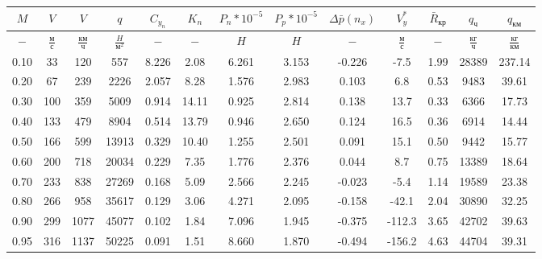 \begin{tabular}{|c|c|c|c|c|c|c|c|c|c|c|c|c|}
\hline
$M$ & $V$ & $V$ & $q$ & $C_{y_n}$ & $K_n$ & $P_n*10^{-5}$ & $P_p*10^{-5}$ & $\Delta \bar{p}(n_x)$ & $V_y^*$ & $\bar{R}_{кр}$ & $q_{ч}$ & $q_{км}$ \\ 
\hline
$-$ & $\frac{м}{с}$ & $\frac{км}{ч}$ & $\frac{H}{м^2}$ & $-$ & $-$ & $H$ & $H$ & $-$ & $\frac{м}{с}$ & $-$ & $\frac{кг}{ч}$ & $\frac{кг}{км}$ \\ 
\hline
0.10 & 33 & 120 & 557 & 8.226 & 2.08 & 6.261 & 3.153 & -0.226 & -7.5 & 1.99 & 28389 & 237.14 \\ 
\hline
0.20 & 67 & 239 & 2226 & 2.057 & 8.28 & 1.576 & 2.983 & 0.103 & 6.8 & 0.53 & 9483 & 39.61 \\ 
\hline
0.30 & 100 & 359 & 5009 & 0.914 & 14.11 & 0.925 & 2.814 & 0.138 & 13.7 & 0.33 & 6366 & 17.73 \\ 
\hline
0.40 & 133 & 479 & 8904 & 0.514 & 13.79 & 0.946 & 2.650 & 0.124 & 16.5 & 0.36 & 6914 & 14.44 \\ 
\hline
0.50 & 166 & 599 & 13913 & 0.329 & 10.40 & 1.255 & 2.501 & 0.091 & 15.1 & 0.50 & 9442 & 15.77 \\ 
\hline
0.60 & 200 & 718 & 20034 & 0.229 & 7.35 & 1.776 & 2.376 & 0.044 & 8.7 & 0.75 & 13389 & 18.64 \\ 
\hline
0.70 & 233 & 838 & 27269 & 0.168 & 5.09 & 2.566 & 2.245 & -0.023 & -5.4 & 1.14 & 19589 & 23.38 \\ 
\hline
0.80 & 266 & 958 & 35617 & 0.129 & 3.06 & 4.271 & 2.095 & -0.158 & -42.1 & 2.04 & 30890 & 32.25 \\ 
\hline
0.90 & 299 & 1077 & 45077 & 0.102 & 1.84 & 7.096 & 1.945 & -0.375 & -112.3 & 3.65 & 42702 & 39.63 \\ 
\hline
0.95 & 316 & 1137 & 50225 & 0.091 & 1.51 & 8.660 & 1.870 & -0.494 & -156.2 & 4.63 & 44704 & 39.31 \\ 
\hline
\end{tabular}